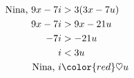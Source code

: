 \pagestyle{empty}
\hfill
\vfill
\begin{align*}
	\textrm{Nina, } 9x-7i &> 3(3x-7u)\\
	9x-7i &> 9x-21u\\
	-7i &> -21u\\
	i &< 3u\\
	\textrm{Nina, } i &{\color{red}\heartsuit} u\\
\end{align*}
%
\vfill